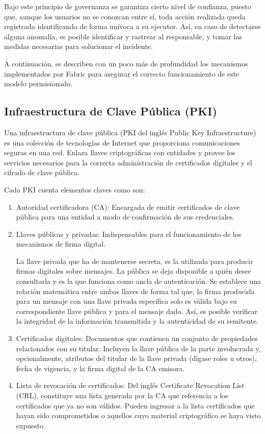 Bajo este principio de governanza se garantiza cierto nivel de confianza, puesto que, aunque los usuarios no se conozcan entre s\'i, toda acci\'on realizada queda registrada identificando de forma un\'ivoca a su ejecutor. As\'i, en caso de detectarse alguna anomal\'ia, es posible identificar y rastrear al responsable, y tomar las medidas necesarias para solucionar el incidente.

A continuaci\'on, se describen con un poco m\'as de profundidad los mecanismos implementados por Fabric para asegurar el correcto funcionamiento de este modelo permisionado.

\subsection{Infraestructura de Clave P\'ublica (PKI)}
Una infraestructura de clave p\'ublica (PKI del ingl\'es Public Key Infraestructure) es una colección de tecnolog\'ias de Internet que proporciona comunicaciones seguras en una red. Enlaza llaves criptogr\'aficas con entidades y provee los servicios necesarios para la correcta administraci\'on de certificados digitales y el cifrado de clave p\'ublica.

Cada PKI cuenta elementos claves como son:
\begin{enumerate}
	\item Autoridad certificadora (CA): Encargada de emitir certificados de clave p\'ublica para una entidad a modo de confirmaci\'on de sus credenciales.
	
	\item Llaves p\'ublicas y privadas: Indispensables para el funcionamiento de los mecanismos de firma digital.
	
	La llave privada que ha de mantenerse secreta, es la utilizada para producir firmas digitales sobre mensajes. La p\'ublica se deja disponible a qui\'en desee consultarla y es la que funciona como ancla de autenticaci\'on. Se establece una relaci\'on matem\'atica entre ambas llaves de forma tal que, la firma producida para un mensaje con una llave privada espec\'ifica solo es v\'alida bajo su correspondiente llave p\'ublica y para el mensaje dado. As\'i, es posible verificar la integridad de la informaci\'on transmitida y la autenticidad de su remitente.
	
	\item Certificados digitales: Documentos que contienen un conjunto de propiedades relacionados con su titular. Incluyen la llave p\'ublica de la parte involucrada y, opcionalmente, atributos del titular de la llave privada (d\'igase roles u otros), fecha de vigencia, y la firma digital de la CA emisora.
	
	\item Lista de revocaci\'on de certificados: Del ingl\'es Certificate Revocation List (CRL), constituye una lista generada por la CA que referencia a los certificados que ya no son v\'alidos. Pueden ingresar a la lista certificados que hayan sido comprometidos o aquellos cuyo material criptogr\'afico se haya visto expuesto.
	
\end{enumerate}

